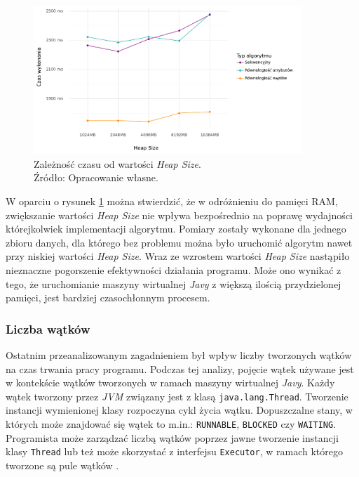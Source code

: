 \documentclass[12pt]{article}
\begin{document}
\begin{figure}[H]
    \centering
	\includegraphics[width=0.9\textwidth]{analysis-heap-size.pdf}
    \caption{Zależność czasu od wartości \textit{Heap Size}.\\Źródło: Opracowanie własne.}
    \label{fig:analysis-heap-size}
\end{figure}

W oparciu o rysunek \ref{fig:analysis-heap-size} można stwierdzić, że w odróżnieniu do pamięci RAM,
zwiększanie wartości \textit{Heap Size} nie wpływa bezpośrednio na poprawę wydajności którejkolwiek implementacji algorytmu.
Pomiary zostały wykonane dla jednego zbioru danych, dla którego bez problemu można było uruchomić algorytm nawet
przy niskiej wartości \textit{Heap Size}. Wraz ze wzrostem wartości \textit{Heap Size} nastąpiło nieznaczne pogorszenie efektywności działania programu. 
Może ono wynikać z tego, że uruchomianie maszyny wirtualnej \textit{Javy} z większą ilością przydzielonej pamięci, jest bardziej czasochłonnym procesem.

\subsubsection{Liczba wątków}
Ostatnim przeanalizowanym zagadnieniem był wpływ liczby tworzonych wątków na czas trwania
pracy programu. Podczas tej analizy, pojęcie wątek używane jest w kontekście wątków
tworzonych w ramach maszyny wirtualnej \textit{Javy}. Każdy wątek tworzony przez \textit{JVM} związany jest
z klasą \verb|java.lang.Thread|. Tworzenie instancji wymienionej klasy rozpoczyna cykl życia wątku.
Dopuszczalne stany, w których może znajdować się wątek to m.in.: \verb|RUNNABLE|, 
\verb|BLOCKED| czy \verb|WAITING|. Programista może zarządzać liczbą wątków poprzez jawne tworzenie instancji
klasy \verb|Thread| lub też może skorzystać z interfejsu \verb|Executor|, w ramach którego tworzone są pule wątków \cite{java-threads}.
\end{document}
